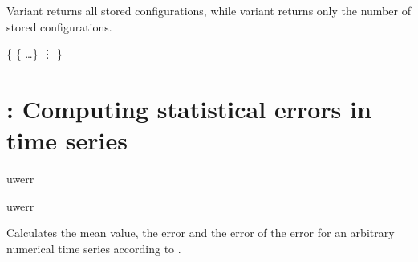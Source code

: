 Variant  returns all stored configurations, while variant
 returns only the number of stored configurations.

\begin{code}
\{
  \{      \dots \}
  \vdots
\}
\end{code}

\section{: Computing statistical errors in time series}
\label{sec:uwerr}

\begin{essyntax}
   uwerr   
    

   uwerr   
    
\end{essyntax}
Calculates the mean value, the error and the error of the error for an
arbitrary numerical time series according to \citet{wolff04a}.

